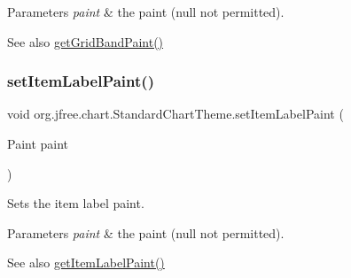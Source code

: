\begin{DoxyParams}{Parameters}
{\em paint} & the paint ({\ttfamily null} not permitted).\\
\hline
\end{DoxyParams}
\begin{DoxySeeAlso}{See also}
\mbox{\hyperlink{classorg_1_1jfree_1_1chart_1_1_standard_chart_theme_aa3daf85d499182e7c15b01e65e7ef569}{get\+Grid\+Band\+Paint()}} 
\end{DoxySeeAlso}
\mbox{\label{classorg_1_1jfree_1_1chart_1_1_standard_chart_theme_a9eacac654f7481bcc9265b81b419f1fb}} 
\subsubsection{\texorpdfstring{set\+Item\+Label\+Paint()}{setItemLabelPaint()}}
{\footnotesize\ttfamily void org.\+jfree.\+chart.\+Standard\+Chart\+Theme.\+set\+Item\+Label\+Paint (\begin{DoxyParamCaption}\item[{Paint}]{paint }\end{DoxyParamCaption})}

Sets the item label paint.


\begin{DoxyParams}{Parameters}
{\em paint} & the paint ({\ttfamily null} not permitted).\\
\hline
\end{DoxyParams}
\begin{DoxySeeAlso}{See also}
\mbox{\hyperlink{classorg_1_1jfree_1_1chart_1_1_standard_chart_theme_ad04edff5df5b061f66f748a20be6a4fe}{get\+Item\+Label\+Paint()}} 
\end{DoxySeeAlso}
\mbox{\label{classorg_1_1jfree_1_1chart_1_1_standard_chart_theme_ac48a6a4060505c5f9627aa0c10e3da42}} 
